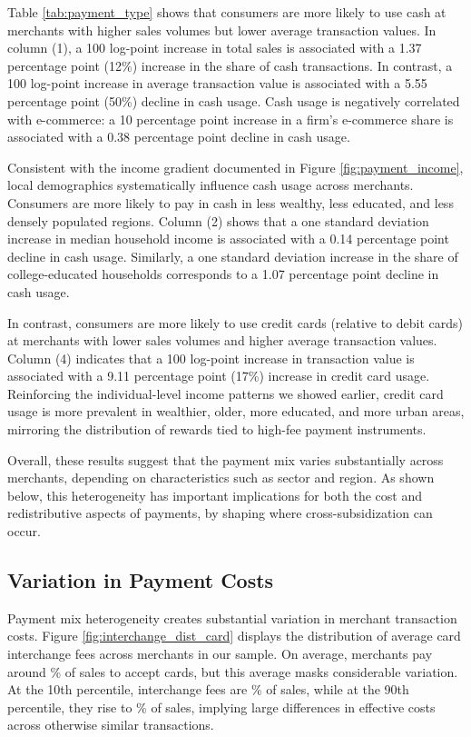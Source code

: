\documentclass[main.tex]{subfiles}
\begin{document}
Table \ref{tab:payment_type} shows that consumers are more likely to use cash at merchants with higher sales volumes but lower average transaction values.
In column (1), a 100 log-point increase in total sales is associated with a 1.37 percentage point (12\%) increase in the share of cash transactions.
In contrast, a 100 log-point increase in average transaction value is associated with a 5.55 percentage point (50\%) decline in cash usage.
Cash usage is negatively correlated with e-commerce: a 10 percentage point increase in a firm's e-commerce share is associated with a 0.38 percentage point decline in cash usage.

Consistent with the income gradient documented in Figure \ref{fig:payment_income}, local demographics systematically influence cash usage across merchants. Consumers are more likely to pay in cash in less wealthy, less educated, and less densely populated regions.
Column (2) shows that a one standard deviation increase in median household income is associated with a 0.14 percentage point decline in cash usage.
Similarly, a one standard deviation increase in the share of college-educated households corresponds to a 1.07 percentage point decline in cash usage.

In contrast, consumers are more likely to use credit cards (relative to debit cards) at merchants with lower sales volumes and higher average transaction values.
Column (4) indicates that a 100 log-point increase in transaction value is associated with a 9.11 percentage point (17\%) increase in credit card usage.
Reinforcing the individual-level income patterns we showed earlier, credit card usage is more prevalent in wealthier, older, more educated, and more urban areas, mirroring the distribution of rewards tied to high-fee payment instruments.

Overall, these results suggest that the payment mix varies substantially across merchants, depending on characteristics such as sector and region.
As shown below, this heterogeneity has important implications for both the cost and redistributive aspects of payments, by shaping where cross-subsidization can occur.

\subsection{Variation in Payment Costs}
Payment mix heterogeneity creates substantial variation in merchant transaction costs.
Figure \ref{fig:interchange_dist_card} displays the distribution of average card interchange fees across merchants in our sample.
On average, merchants pay around \% of sales to accept cards, but this average masks considerable variation.
At the 10th percentile, interchange fees are \% of sales, while at the 90th percentile, they rise to \% of sales, implying large differences in effective costs across otherwise similar transactions.
\end{document}
